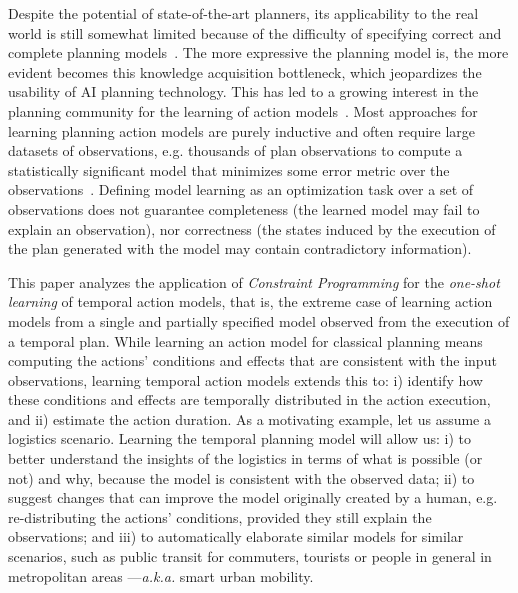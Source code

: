\documentclass{ecai}
\begin{document}
Despite the potential of state-of-the-art planners, its applicability to the real world is still somewhat limited because of the difficulty of specifying correct and complete planning models~\cite{kambhampati2007model}. The more expressive the planning model is, the more evident becomes this knowledge acquisition bottleneck, which jeopardizes the usability of AI planning technology. This has led to a growing interest in the planning community for the learning of action models~\cite{jimenez2012review}. Most approaches for learning planning action models are purely inductive and often require large datasets of observations, e.g. thousands of plan observations to compute a statistically significant model that minimizes some error metric over the observations~\cite{yang2007learning,MouraoZPS12,zhuo2013action,kuvcera2018louga}. Defining model learning as an optimization task over a set of observations does not guarantee completeness (the learned model may fail to explain an observation), nor correctness (the states induced by the execution of the plan generated with the model may contain contradictory information).

This paper analyzes the application of {\em Constraint Programming} for the {\em one-shot learning} of temporal action models, that is, the extreme case of learning action models from a single and partially specified model observed from the execution of a temporal plan. While learning an action model for classical planning means computing the actions' conditions and effects that are consistent with the input observations, learning temporal action models extends this to: i) identify how these conditions and effects are temporally distributed in the action execution, and ii) estimate the action duration. As a motivating example, let us assume a logistics scenario. Learning the temporal planning model will allow us: i) to better understand the insights of the logistics in terms of what is possible (or not) and why, because the model is consistent with the observed data; ii) to suggest changes that can improve the model originally created by a human, e.g. re-distributing the actions' conditions, provided they still explain the observations; and iii) to automatically elaborate
similar models for similar scenarios, such as public transit for commuters, tourists or people in general in metropolitan areas ---\emph{a.k.a.} smart urban mobility.
\end{document}

